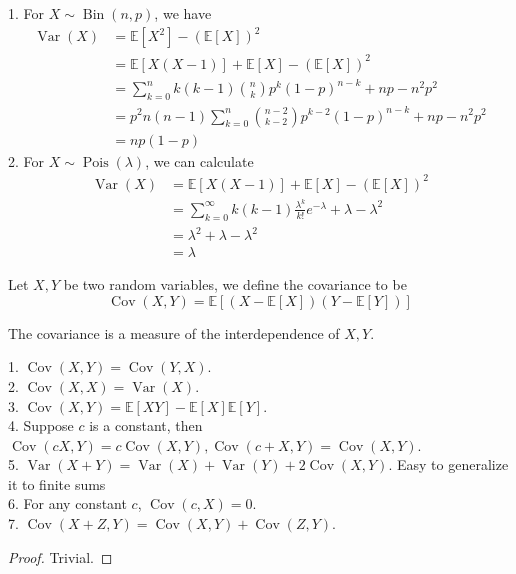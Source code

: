 \begin{example}
    1. For $X\sim\operatorname{Bin}(n,p)$, we have
    \begin{align*}
        \operatorname{Var}(X)&=\mathbb E[X^2]-(\mathbb E[X])^2\\
        &=\mathbb E[X(X-1)]+\mathbb E[X]-(\mathbb E[X])^2\\
        &=\sum_{k=0}^nk(k-1)\binom{n}{k}p^k(1-p)^{n-k}+np-n^2p^2\\
        &=p^2n(n-1)\sum_{k=0}^n\binom{n-2}{k-2}p^{k-2}(1-p)^{n-k}+np-n^2p^2\\
        &=np(1-p)
    \end{align*}
    2. For $X\sim\operatorname{Pois}(\lambda)$, we can calculate
    \begin{align*}
        \operatorname{Var}(X)&=\mathbb E[X(X-1)]+\mathbb E[X]-(\mathbb E[X])^2\\
        &=\sum_{k=0}^\infty k(k-1)\frac{\lambda^k}{k!}e^{-\lambda}+\lambda-\lambda^2\\
        &=\lambda^2+\lambda-\lambda^2\\
        &=\lambda
    \end{align*}
\end{example}
\begin{definition}
    Let $X,Y$ be two random variables, we define the covariance to be
    $$\operatorname{Cov}(X,Y)=\mathbb E[(X-\mathbb E[X])(Y-\mathbb E[Y])]$$
\end{definition}
The covariance is a measure of the interdependence of $X,Y$.
\begin{proposition}
    1. $\operatorname{Cov}(X,Y)=\operatorname{Cov}(Y,X)$.\\
    2. $\operatorname{Cov}(X,X)=\operatorname{Var}(X)$.\\
    3. $\operatorname{Cov}(X,Y)=\mathbb E[XY]-\mathbb E[X]\mathbb E[Y]$.\\
    4. Suppose $c$ is a constant, then $\operatorname{Cov}(cX,Y)=c\operatorname{Cov}(X,Y),\operatorname{Cov}(c+X,Y)=\operatorname{Cov}(X,Y)$.\\
    5. $\operatorname{Var}(X+Y)=\operatorname{Var}(X)+\operatorname{Var}(Y)+2\operatorname{Cov}(X,Y)$.
    Easy to generalize it to finite sums\\
    6. For any constant $c$, $\operatorname{Cov}(c,X)=0$.\\
    7. $\operatorname{Cov}(X+Z,Y)=\operatorname{Cov}(X,Y)+\operatorname{Cov}(Z,Y)$.
\end{proposition}
\begin{proof}
    Trivial.
\end{proof}
